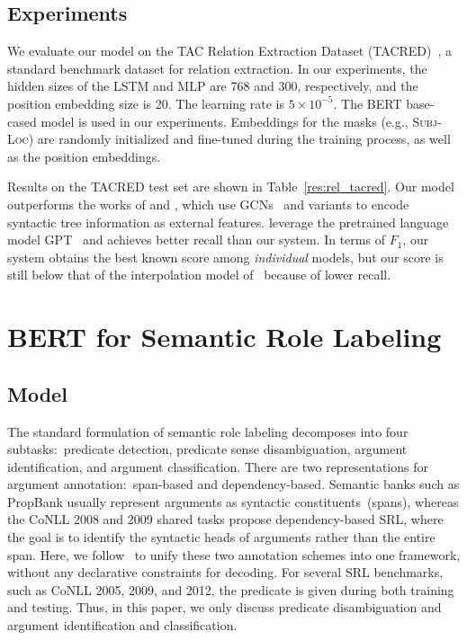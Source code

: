 \documentclass[11pt,a4paper]{article}
\begin{document}
\subsection{Experiments}

We evaluate our model on the TAC Relation Extraction Dataset (TACRED)~\cite{zhang2017position}, a standard benchmark dataset for relation extraction.
In our experiments, the hidden sizes of the LSTM and MLP are 768 and 300, respectively, and the position embedding size is 20. The learning rate is $5 \times 10^{-5}$.  
The BERT base-cased model is used in our experiments. 
Embeddings for the masks (e.g., \textsc{Subj-Loc}) are randomly initialized and fine-tuned during the training process, as well as the position embeddings. 

Results on the TACRED test set are shown in Table~\ref{res:rel_tacred}. 
Our model outperforms the works of \citet{zhang2018graph} and \citet{wu2019simplifying}, which use GCNs~\cite{kipf2016semi} and variants to encode syntactic tree information as external features. 
\citet{alt2018improving} leverage the pretrained language model GPT~\cite{radford2018improving} and achieves better recall than our system. 
In terms of $F_1$, our system obtains the best known score among {\it individual} models, but our score is still below that of the interpolation model of~\citet{zhang2018graph} because of lower recall. 

\section{BERT for Semantic Role Labeling}


\subsection{Model}

The standard formulation of semantic role labeling decomposes into four subtasks:\ predicate detection, predicate sense disambiguation, argument identification, and argument classification. 
There are two representations for argument annotation:\ span-based and dependency-based. 
Semantic banks such as PropBank usually represent arguments as syntactic constituents~(spans), whereas the CoNLL 2008 and 2009 shared tasks propose dependency-based SRL, where the goal is to identify the syntactic heads of arguments rather than the entire span. 
Here, we follow~\citet{li2019dependency} to unify these two annotation schemes into one framework, without any declarative constraints for decoding. 
For several SRL benchmarks, such as CoNLL 2005, 2009, and 2012, the predicate is given during both training and testing. 
Thus, in this paper, we only discuss predicate disambiguation and argument identification and classification.
\end{document}
